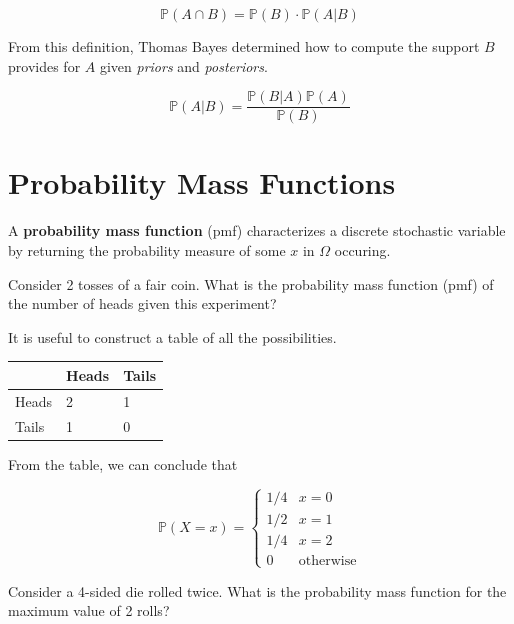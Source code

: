 \documentclass[13pt,oneside]{tufte-book}
\theoremstyle{definition}
\theoremstyle{definition}
\theoremstyle{definition}
\theoremstyle{remark}
\let\BeginKnitrBlock\begin \let\EndKnitrBlock\end
\begin{document}
\[
\mathbb{P}(A \cap B)  = \mathbb{P}(B) \cdot \mathbb{P}\left(A | B\right) 
\]

From this definition, Thomas Bayes determined how to compute the support
\(B\) provides for \(A\) given \emph{priors} and \emph{posteriors}.

\BeginKnitrBlock{theorem}[Bayes' Theorem]
\protect\hypertarget{thm:unnamed-chunk-13}{}{\label{thm:unnamed-chunk-13}
{} }

\begin{equation}
\mathbb{P}( A|B) = \frac{\mathbb{P}(B|A)\mathbb{P}(A)}{\mathbb{P}(B)}
\end{equation}
\EndKnitrBlock{theorem}

\section{Probability Mass Functions}\label{probability-mass-functions}

A \textbf{probability mass function} (pmf) characterizes a discrete
stochastic variable by returning the probability measure of some \(x\)
in \(\Omega\) occuring.

\BeginKnitrBlock{example}
\protect\hypertarget{exm:unnamed-chunk-14}{}{\label{exm:unnamed-chunk-14} }
Consider 2 tosses of a fair coin. What is the probability mass function
(pmf) of the number of heads given this experiment?
\EndKnitrBlock{example}

\BeginKnitrBlock{solution}
{} It is useful to construct a table of all
the possibilities.

\begin{longtable}[]{@{}lll@{}}
\toprule
& Heads & Tails\tabularnewline
\midrule
\endhead
Heads & 2 & 1\tabularnewline
Tails & 1 & 0\tabularnewline
\bottomrule
\end{longtable}

From the table, we can conclude that

\[
\mathbb{P}(X=x) = \begin{cases}
1/4 & x = 0 \\
1/2 & x = 1 \\
1/4 & x = 2 \\
0 & \text{otherwise}
\end{cases}
\]
\EndKnitrBlock{solution}

\BeginKnitrBlock{example}
\protect\hypertarget{exm:unnamed-chunk-16}{}{\label{exm:unnamed-chunk-16} }
Consider a 4-sided die rolled twice. What is the probability mass
function for the maximum value of 2 rolls?
\EndKnitrBlock{example}
\end{document}
